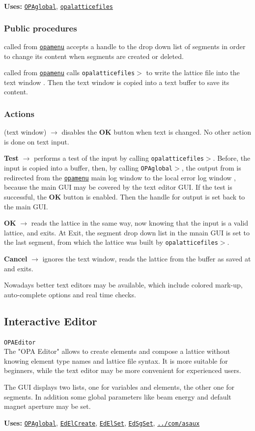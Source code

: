 \documentclass[12pt]{article}
\newcommand\code[1]{{\tt #1}}
\newcommand{\ofld}[1]{\colorbox{black!15}{{\bf #1}}}
\newcommand{\ofldx}[1]{\colorbox{black!15}{(#1)}}
\newcommand\guico[1]{{\color{blue}\code{#1}}}
\newcommand{\unico}[1]{{\color{burntorange}\code{#1}}}
\newcommand{\evcod}[2]{\ofld{#1} $\rightarrow$ \guico{#2}}
\newcommand{\evcodx}[2]{\ofldx{#1} $\rightarrow$ \guico{#2}}
\newcommand{\prcod}[2]{\opauni{#1}$>$\unico{#2}}
\newcommand{\opagui}[1]{\colorbox{blue!20}{\code{#1}}}
\newcommand{\oguih}[2]{\subsection{\label{#2}#1}{\Huge\opagui{#2}}\\}
\newcommand{\ogui}[1]{\hyperref[#1]{\opagui{#1}}}
\newcommand{\opauni}[1]{\colorbox{orange!30}{\code{#1}}}
\newcommand{\ouni}[1]{\hyperref[#1]{\opauni{#1}}}
\newcommand{\uses}[1]{{\bf Uses: } #1}
\newcommand{\act}[1]{\subsubsection*{Actions} #1}
\newcommand{\ppro}[1]{\subsubsection*{Public procedures} #1}
\newcommand{\todo}[1]{{\color{red} #1}}
\begin{document}
\uses{\ouni{OPAglobal}, \ouni{opalatticefiles}}

\ppro{
\guico{Init} called from \ogui{opamenu} accepts a handle to the drop down list of segments in order to change its content when segments are created or deleted.

\guico{LoadLattice} called from \ogui{opamenu} calls \prcod{opalatticefiles}{WriteLattice} to write the lattice file into the text window \guico{EdtWin}. Then the text window is copied into a text buffer to save its content.
}

\act{
\evcodx{text window}{disableOKBut} disables the \ofld{OK} button when text is changed. No other action is done on text input.

\evcod{Test}{filetest} performs a test of the input by calling \prcod{opalatticefiles}{LatRead}. Before, the input is copied into a buffer, then, by calling \prcod{OPAglobal}{PassErrLogHandle}, the output from \unico{LatRead} is redirected from the \ogui{opamenu} main log window to the local error log window \guico{myerrlog}, because the main GUI may be covered by the text editor GUI. If the test is successful, the \ofld{OK} button is enabled. Then the handle for output is set back to the main GUI.


\evcod{OK}{fileget} reads the lattice in the same way, now knowing that the input is a valid lattice, and exits. At Exit, the segment drop down list in the mnain GUI is set to the last segment, from which the lattice was built by \prcod{opalatticefiles}{LatRead}.

\evcod{Cancel}{fileRestore} ignores the text window, reads the lattice from the buffer as saved at \guico{Init} and exits.

}

\todo{Nowadays better text editors may be available, which include colored mark-up, auto-complete options and real time checks.}

\oguih{Interactive Editor}{OPAEditor}

The "OPA Editor" allows to create elements and compose a lattice without knowing element type names and lattice file syntax. It is more suitable for beginners, while the text editor may be more convenient for experienced users.

The GUI displays two lists, one for variables and elements, the other one for segments. In addition some global parameters like beam energy and default magnet aperture may be set.

\uses{\ouni{OPAglobal}, \ogui{EdElCreate}, \ogui{EdElSet}, \ogui{EdSgSet}, \ouni{../com/asaux}}
\end{document}
